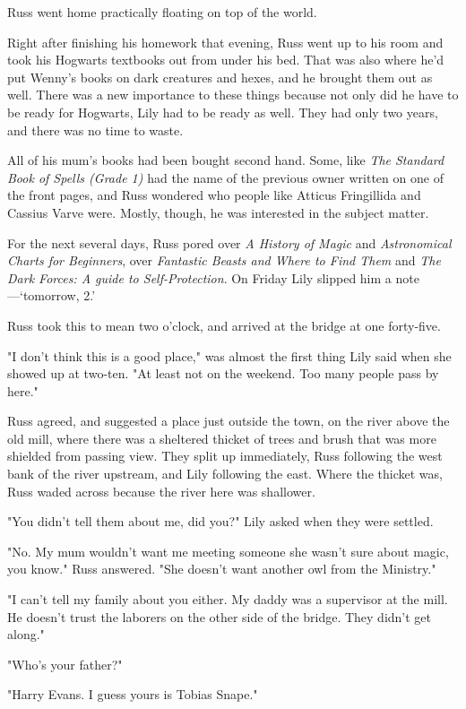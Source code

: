 Russ went home practically floating on top of the world.

Right after finishing his homework that evening, Russ went up to his room and took his Hogwarts textbooks out from under his bed. That was also where he'd put Wenny's books on dark creatures and hexes, and he brought them out as well. There was a new importance to these things because not only did he have to be ready for Hogwarts, Lily had to be ready as well. They had only two years, and there was no time to waste.

All of his mum's books had been bought second hand. Some, like \emph{The Standard Book of Spells (Grade 1)} had the name of the previous owner written on one of the front pages, and Russ wondered who people like Atticus Fringillida and Cassius Varve were. Mostly, though, he was interested in the subject matter.

For the next several days, Russ pored over \emph{A History of Magic} and \emph{Astronomical Charts for Beginners}, over \emph{Fantastic Beasts and Where to Find Them} and \emph{The Dark Forces: A guide to Self-Protection}. On Friday Lily slipped him a note—`tomorrow, 2.'

Russ took this to mean two o'clock, and arrived at the bridge at one forty-five.

"I don't think this is a good place," was almost the first thing Lily said when she showed up at two-ten. "At least not on the weekend. Too many people pass by here."

Russ agreed, and suggested a place just outside the town, on the river above the old mill, where there was a sheltered thicket of trees and brush that was more shielded from passing view. They split up immediately, Russ following the west bank of the river upstream, and Lily following the east. Where the thicket was, Russ waded across because the river here was shallower.

"You didn't tell them about me, did you?" Lily asked when they were settled.

"No. My mum wouldn't want me{\el} meeting someone she wasn't{\el} sure about{\el} magic, you know." Russ answered. "She doesn't{\el} want another owl from the{\el} Ministry."

"I can't tell my family about you either. My daddy was a supervisor at the mill. He doesn't trust the laborers on the other side of the bridge. They didn't get along."

"Who's your{\el} father?"

"Harry Evans. I guess yours is Tobias Snape."

